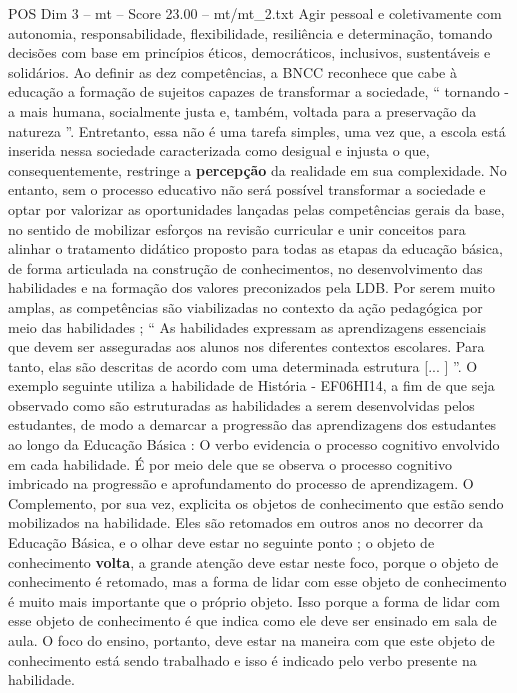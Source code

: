 \begin{textsample}{POS Dim 3 – mt – Score 23.00 – mt/mt\_2.txt}
Agir pessoal e coletivamente com autonomia, responsabilidade, flexibilidade, resiliência e determinação, tomando decisões com base em princípios éticos, democráticos, inclusivos, sustentáveis e solidários.
Ao definir as dez competências, a BNCC reconhece que cabe à educação a formação de sujeitos capazes de transformar a sociedade, “ tornando -a mais humana, socialmente justa e, também, voltada para a preservação da natureza ”.
Entretanto, essa não é uma tarefa simples, uma vez que, a escola está inserida nessa sociedade caracterizada como desigual e injusta o que, consequentemente, restringe a \textbf{percepção} da realidade em sua complexidade.
No entanto, sem o processo educativo não será possível transformar a sociedade e optar por valorizar as oportunidades lançadas pelas competências gerais da base, no sentido de mobilizar esforços na revisão curricular e unir conceitos para alinhar o tratamento didático proposto para todas as etapas da educação básica, de forma articulada na construção de conhecimentos, no desenvolvimento das habilidades e na formação dos valores preconizados pela LDB.
Por serem muito amplas, as competências são viabilizadas no contexto da ação pedagógica por meio das habilidades ; “ As habilidades expressam as aprendizagens essenciais que devem ser asseguradas aos alunos nos diferentes contextos escolares.
Para tanto, elas são descritas de acordo com uma determinada estrutura [... ] ”.
O exemplo seguinte utiliza a habilidade de História - EF06HI14, a fim de que seja observado como são estruturadas as habilidades a serem desenvolvidas pelos estudantes, de modo a demarcar a progressão das aprendizagens dos estudantes ao longo da Educação Básica : O verbo evidencia o processo cognitivo envolvido em cada habilidade.
É por meio dele que se observa o processo cognitivo imbricado na progressão e aprofundamento do processo de aprendizagem.
O Complemento, por sua vez, explicita os objetos de conhecimento que estão sendo mobilizados na habilidade.
Eles são retomados em outros anos no decorrer da Educação Básica, e o olhar deve estar no seguinte ponto ; o objeto de conhecimento \textbf{volta}, a grande atenção deve estar neste foco, porque o objeto de conhecimento é retomado, mas a forma de lidar com esse objeto de conhecimento é muito mais importante que o próprio objeto.
Isso porque a forma de lidar com esse objeto de conhecimento é que indica como ele deve ser ensinado em sala de aula.
O foco do ensino, portanto, deve estar na maneira com que este objeto de conhecimento está sendo trabalhado e isso é indicado pelo verbo presente na habilidade.

\end{textsample}
